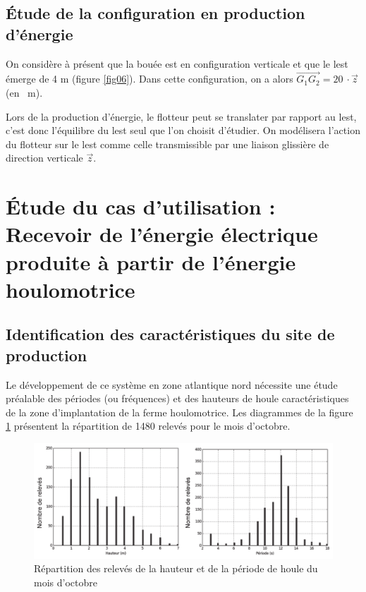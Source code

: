 

\subsection{Étude de la configuration en production d'énergie}

On considère à présent que la bouée est en configuration verticale et que le lest émerge de 4 m (figure \ref{fig06}). Dans cette configuration, on a alors $\overrightarrow{G_1G_2}=\SI{20}{}\cdot\vec{z}$ (en \SI{}{\m}).

Lors de la production d'énergie, le flotteur peut se translater par rapport au lest, c'est donc l'équilibre du lest seul que l'on choisit d'étudier. On modélisera l'action du flotteur sur le lest comme celle transmissible par une liaison glissière de direction verticale $\vec{z}$.



\section{Étude du cas d'utilisation : \og Recevoir de l'énergie électrique produite à partir de l'énergie houlomotrice \fg}

\subsection{Identification des caractéristiques du site de production}

Le développement de ce système en zone atlantique nord nécessite une étude préalable des périodes (ou fréquences) et des hauteurs de houle caractéristiques de la zone d'implantation de la ferme houlomotrice. Les diagrammes de la figure \ref{fig07} présentent la répartition de 1480 relevés pour le mois d'octobre.

\begin{figure}[ht!]
  \begin{center}
    \includegraphics[width=0.85\linewidth]{img/fig07}
  \end{center}
  \caption{Répartition des relevés de la hauteur et de la période de houle du mois d'octobre}
\label{fig07}
\end{figure}


